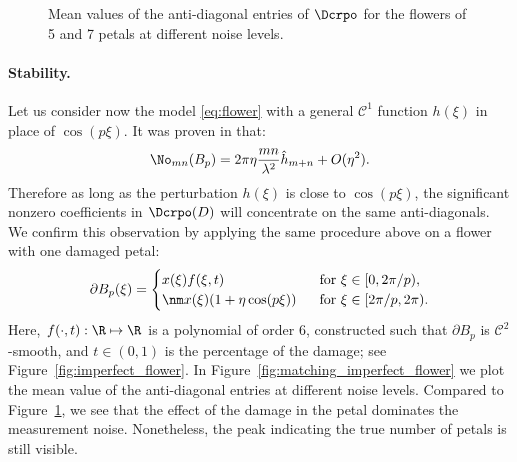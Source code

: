 \begin{figure}[htp]
  \centering
  \caption{Mean values of the anti-diagonal entries of $\Dcrpo$ for the flowers of
    5 and 7 petals at different noise levels.}
  \label{fig:matching_flower}
\end{figure}

\paragraph{Stability.}
Let us consider now the model \eqref{eq:flower} with a general
$\mathcal{C}^1$ function $h(\xi)$ in place of $\cos(p\xi)$. It was
proven in \cite{AGKLY11} that:
\begin{align}
  \No_{mn}(B_p) = 2\pi\eta\frac{mn}{\lambda^2}\hat
  h_{m+n} + O(\eta^2).
  \label{eq:flower_CGPT_Fourier}
\end{align}
Therefore as long as the perturbation $h(\xi)$ is close to
$\cos(p\xi)$, the significant nonzero coefficients in $\Dcrpo(D)$
will concentrate on the same anti-diagonals. We confirm this
observation by applying the same procedure above on a flower with
one damaged petal:
\begin{align}
  \label{eq:damaged_flower}
  \partial B_p(\xi) =
  \begin{cases}
    x(\xi)f(\xi, t) \ &\mbox{ for } \xi\in[0,2\pi/p),\\
    \nm
    x(\xi)(1+\eta \cos(p\xi)) \ &\mbox{ for } \xi\in[2\pi/p,
    2\pi).
  \end{cases}
\end{align}
Here, $f(\cdot, t):\R\mapsto\R$ is a polynomial of order 6,
constructed such that $\partial B_p$ is $\mathcal{C}^2$-smooth,
and $t \in (0,1)$ is the percentage of the damage; see
Figure~\ref{fig:imperfect_flower}. In
Figure~\ref{fig:matching_imperfect_flower} we plot the mean value
of the anti-diagonal entries at different noise levels. Compared
to Figure~\ref{fig:matching_flower}, we see that the effect of the
damage in the petal dominates the measurement noise. Nonetheless,
the peak indicating the true number of petals is still visible.

